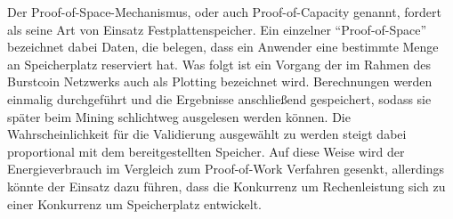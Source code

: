 Der Proof-of-Space-Mechanismus, oder auch Proof-of-Capacity genannt, fordert als seine Art von Einsatz Festplattenspeicher. Ein einzelner “Proof-of-Space” bezeichnet dabei Daten, die belegen, dass ein Anwender eine bestimmte Menge an Speicherplatz reserviert hat. Was folgt ist ein Vorgang der im Rahmen des Burstcoin Netzwerks auch als Plotting bezeichnet wird. Berechnungen werden einmalig durchgeführt und die Ergebnisse anschließend gespeichert, sodass sie später beim Mining schlichtweg ausgelesen werden können. Die Wahrscheinlichkeit für die Validierung ausgewählt zu werden steigt dabei proportional mit dem bereitgestellten Speicher. Auf diese Weise wird der Energieverbrauch im Vergleich zum Proof-of-Work Verfahren gesenkt, allerdings könnte der Einsatz dazu führen, dass die Konkurrenz um Rechenleistung sich zu einer Konkurrenz um Speicherplatz entwickelt.